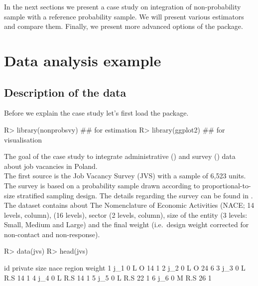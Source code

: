 \documentclass[
]{jss}
\begin{document}
In the next sections we present a case study on integration of
non-probability sample with a reference probability sample. We will
present various estimators and compare them. Finally, we present more
advanced options of the package.

\section{Data analysis example}\label{sec-data-analysis}

\subsection{Description of the data}\label{description-of-the-data}

Before we explain the case study let's first load the package.

\begin{CodeChunk}
\begin{CodeInput}
R> library(nonprobsvy) ## for estimation
R> library(ggplot2) ## for visualisation
\end{CodeInput}
\end{CodeChunk}

The goal of the case study to integrate administrative ()
and survey () data about job vacancies in Poland.\\
The first source is the Job Vacancy Survey (JVS) with a sample of 6,523
units. The survey is based on a probability sample drawn according to
proportional-to-size stratified sampling design. The details regarding
the survey can be found in \cite{jvs2022}. The dataset contains about
The Nomenclature of Economic Activities (NACE; 14 levels, 
column),  (16 levels), sector (2 levels, 
column), size of the entity (3 levels: Small, Medium and Large) and the
final weight (i.e.~design weight corrected for non-contact and
non-response).

\begin{CodeChunk}
\begin{CodeInput}
R> data(jvs)
R> head(jvs)
\end{CodeInput}
\begin{CodeOutput}
   id private size nace region weight
1 j_1       0    L    O     14      1
2 j_2       0    L    O     24      6
3 j_3       0    L  R.S     14      1
4 j_4       0    L  R.S     14      1
5 j_5       0    L  R.S     22      1
6 j_6       0    M  R.S     26      1
\end{CodeOutput}
\end{CodeChunk}
\end{document}
